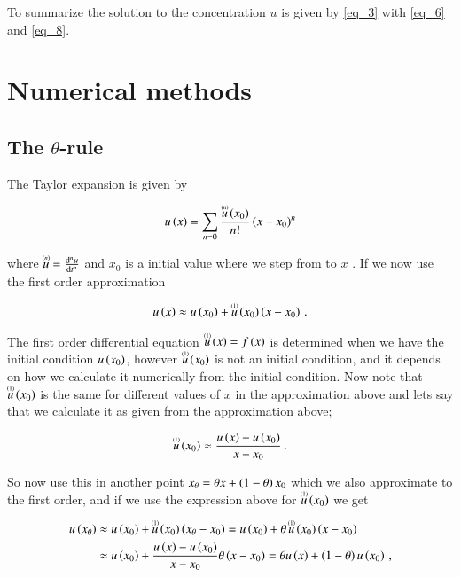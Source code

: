 \documentclass[11pt,english,a4paper]{article}
\begin{document}
\begin{flushleft}
To summarize the solution to the concentration $u$ is given by \eqref{eq_3} with \eqref{eq_6} and \eqref{eq_8}. 


\section{Numerical methods}

\subsection{The $\theta$-rule}

The Taylor expansion is given by

\begin{align}
u\p{x} = \sum_{n=0} \frac{\T{u}{(n)}\p{x_0}}{n!}\p{x-x_0}^n
\label{eq_9}
\end{align}

where $\T{u}{(n)} = \frac{\mathrm{d}^n u}{\mathrm{d}t^n}$ and $x_0$ is a initial value where we step from to $x$ . If we now use the first order approximation

\begin{align*}
u\p{x} \approx u\p{x_0} + \T{u}{(1)}\p{x_0}\p{x-x_0} \,.
\end{align*}

The first order differential equation $\T{u}{(1)}\p{x} = f\p{x}$ is determined when we have the initial condition $u\p{x_0}$, however $\T{u}{(1)}\p{x_0}$ is not an initial condition, and it depends on how we calculate it numerically from the initial condition. Now note that $\T{u}{(1)}\p{x_0}$ is the same for different values of $x$ in the approximation above and lets say that we calculate it as given from the approximation above;

\begin{align}
\T{u}{(1)}\p{x_0} \approx \frac{u\p{x}-u\p{x_0}}{x-x_0}\,.
\label{eq_10}
\end{align}

So now use this in another point $x_{\theta} = \theta x + \p{1-\theta}x_0$ which we also approximate to the first order, and if we use the expression above for $\T{u}{(1)}\p{x_0}$ we get

\begin{align}
u\p{x_\theta} &\approx u\p{x_0} + \T{u}{(1)}\p{x_0}\p{x_{\theta}-x_0} = u\p{x_0} + \theta\,\T{u}{(1)}\p{x_0}\p{x-x_0} 
\nonumber\\
&\approx u\p{x_0} + \frac{u\p{x}-u\p{x_0}}{x-x_0}\theta\p{x-x_0} = \theta u\p{x} + \p{1-\theta}u\p{x_0} \,,
\label{eq_11}
\end{align}


\end{flushleft}
\end{document}
